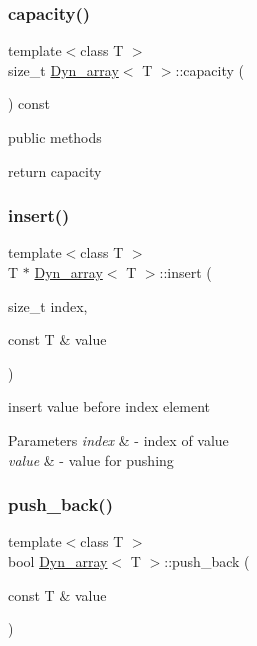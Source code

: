 \subsubsection{\texorpdfstring{capacity()}{capacity()}}
{\footnotesize\ttfamily template$<$class T $>$ \\
size\+\_\+t \hyperlink{classDyn__array}{Dyn\+\_\+array}$<$ T $>$\+::capacity (\begin{DoxyParamCaption}{ }\end{DoxyParamCaption}) const}



public methods 

return capacity \mbox{\label{classDyn__array_a4b261db6ebc4b4b13136e262c955c71a}} 
\subsubsection{\texorpdfstring{insert()}{insert()}}
{\footnotesize\ttfamily template$<$class T $>$ \\
T $\ast$ \hyperlink{classDyn__array}{Dyn\+\_\+array}$<$ T $>$\+::insert (\begin{DoxyParamCaption}\item[{size\+\_\+t}]{index,  }\item[{const T \&}]{value }\end{DoxyParamCaption})}



insert value before index element 


\begin{DoxyParams}{Parameters}
{\em index} & -\/ index of value \\
\hline
{\em value} & -\/ value for pushing \\
\hline
\end{DoxyParams}
\mbox{\label{classDyn__array_a24797d477a7655bf37d1b1dd97eac1e3}} 
\subsubsection{\texorpdfstring{push\+\_\+back()}{push\_back()}}
{\footnotesize\ttfamily template$<$class T $>$ \\
bool \hyperlink{classDyn__array}{Dyn\+\_\+array}$<$ T $>$\+::push\+\_\+back (\begin{DoxyParamCaption}\item[{const T \&}]{value }\end{DoxyParamCaption})}



